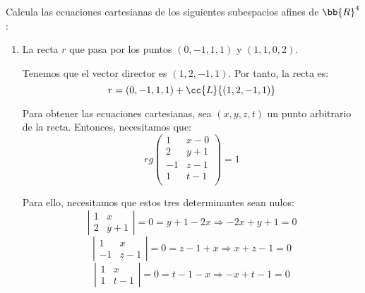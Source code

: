 \begin{ejercicio}
    Calcula las ecuaciones cartesianas de los siguientes subespacios afines de $\bb{R}^4$:
    \begin{enumerate}
        \item La recta $r$ que pasa por los puntos $(0, -1, 1, 1)$ y $(1, 1, 0, 2)$.

        Tenemos que el vector director es $(1, 2, -1, 1)$. Por tanto, la recta es:
        \begin{equation*}
            r = (0,-1,1,1) + \cc{L}\{(1,2,-1,1)\}
        \end{equation*}

        Para obtener las ecuaciones cartesianas, sea $(x,y,z,t)$ un punto arbitrario de la recta. Entonces, necesitamos que:
        \begin{equation*}
            rg\left(\begin{array}{cc}
                1 & x-0 \\
                2 & y +1 \\
                -1 & z- 1 \\
                1 & t-1 \\
            \end{array}\right) = 1
        \end{equation*}

        Para ello, necesitamos que estos tres determinantes sean nulos:
        \begin{equation*}
            \left|\begin{array}{cc}
                1 & x \\
                2 & y+1
            \end{array}\right| = 0 = y+1-2x \Longrightarrow -2x+y+1=0
        \end{equation*}
        \begin{equation*}
            \left|\begin{array}{cc}
                1 & x \\
                -1 & z-1
            \end{array}\right| = 0 = z-1+x \Longrightarrow x+z-1=0
        \end{equation*}
        \begin{equation*}
            \left|\begin{array}{cc}
                1 & x \\
                1 & t-1
            \end{array}\right| = 0 = t-1-x \Longrightarrow -x+t-1=0
        \end{equation*}


\end{enumerate}
\end{ejercicio}
